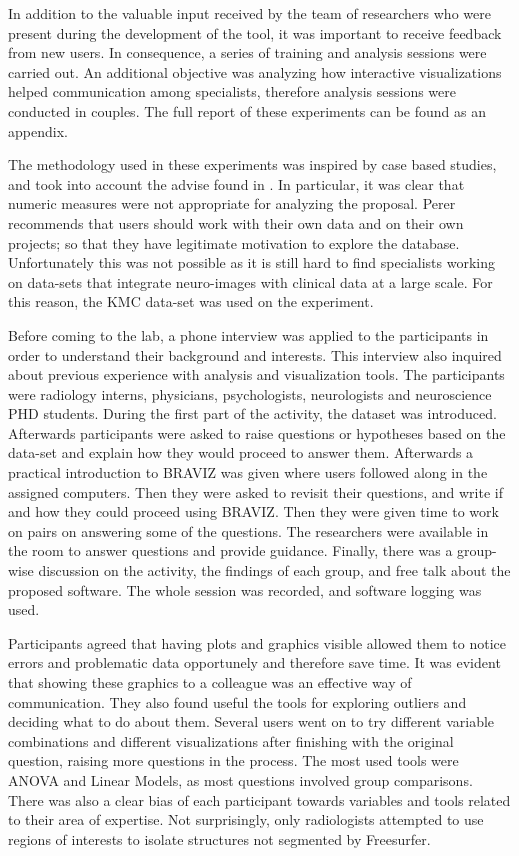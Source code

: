 In addition to the valuable input received by the team of researchers who were present during the development of the tool, it was important to receive feedback from new users. In consequence, a series of training and analysis sessions were carried out. An additional objective was analyzing how interactive visualizations helped communication among specialists, therefore analysis sessions were conducted in couples. The full report of these experiments can be found as an appendix. 

The methodology used in these experiments was inspired by case based studies, and took into account the advise found in \autocite{lam_seven_2011}. In particular, it was clear that numeric measures were not appropriate for analyzing the proposal. Perer \autocite{perer_integrating_2008} recommends that users should work with their own data and on their own projects; so that they have legitimate motivation to explore the database. Unfortunately this was not possible as it is still hard to find specialists working on data-sets that integrate neuro-images with clinical data at a large scale. For this reason, the KMC data-set was used on the experiment. 

Before coming to the lab, a phone interview was applied to the participants in order to understand their background and interests. This interview also inquired about previous experience with analysis and visualization tools. The participants were radiology interns, physicians, psychologists, neurologists and neuroscience PHD students. During the first part of the activity, the dataset was introduced. Afterwards participants were asked to raise questions or hypotheses based on the data-set and explain how they would proceed to answer them. Afterwards a practical introduction to BRAVIZ was given where users followed along in the assigned computers. Then they were asked to revisit their questions, and write if and how they could proceed using BRAVIZ. Then  they were given time to work on pairs on answering some of the questions. The researchers were available in the room to answer questions and provide guidance. Finally, there was a group-wise discussion on the activity, the findings of each group, and free talk about the proposed software. The whole session was recorded, and software logging was used. 

Participants agreed that having plots and graphics visible allowed them to notice errors and problematic data opportunely and therefore save time.  It was evident that showing these graphics to a colleague was an effective way of communication. They also found useful the tools for exploring outliers and deciding what to do about them. Several users went on to try different variable combinations and different visualizations after finishing with the original question, raising more questions in the process. The most used tools were ANOVA and Linear Models, as most questions involved group comparisons. There was also a clear bias of each participant towards variables and tools related to their area of expertise.  Not surprisingly, only radiologists attempted to use regions of interests to isolate structures not segmented by Freesurfer. 

